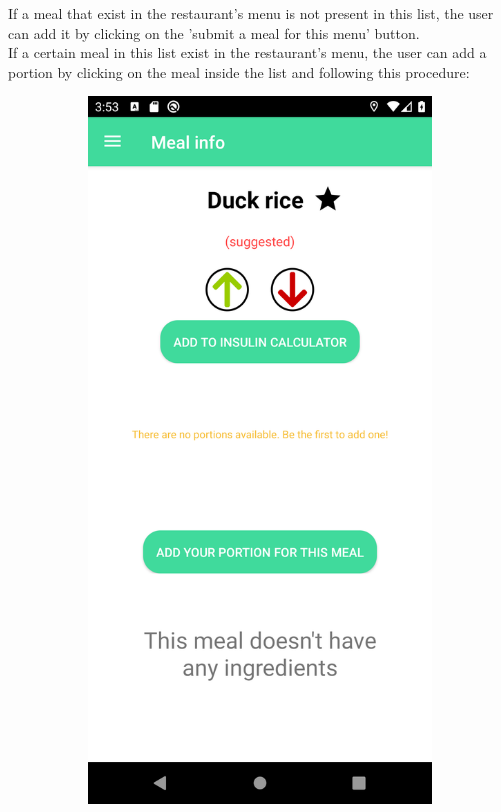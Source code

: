If a meal that exist in the restaurant's menu is not present in this list, the user can add it by clicking on the 
'submit a meal for this menu' button.\\

If a certain meal in this list exist in the restaurant's menu, the user can add a portion by clicking on the meal inside the list
and following this procedure:\\

\begin{figure}[H]
    \captionsetup[subfigure]{justification=centering}
    \begin{center}
        \begin{subfigure}{.3\textwidth}
            \includegraphics[scale=0.1, width=\textwidth]{_figures/meal_detail.png}

\end{subfigure}
\end{center}
\end{figure}
